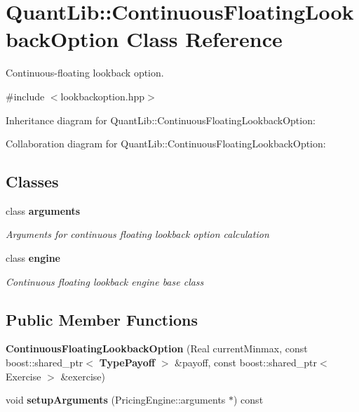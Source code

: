 \section{Quant\+Lib\+:\+:Continuous\+Floating\+Lookback\+Option Class Reference}
\label{class_quant_lib_1_1_continuous_floating_lookback_option}


Continuous-\/floating lookback option.  




{\ttfamily \#include $<$lookbackoption.\+hpp$>$}



Inheritance diagram for Quant\+Lib\+:\+:Continuous\+Floating\+Lookback\+Option\+:


Collaboration diagram for Quant\+Lib\+:\+:Continuous\+Floating\+Lookback\+Option\+:
\subsection*{Classes}
\begin{DoxyCompactItemize}
\item 
class {\bf arguments}
\begin{DoxyCompactList}\small\item\em Arguments for continuous floating lookback option calculation \end{DoxyCompactList}\item 
class {\bf engine}
\begin{DoxyCompactList}\small\item\em Continuous floating lookback engine base class \end{DoxyCompactList}\end{DoxyCompactItemize}
\subsection*{Public Member Functions}
\begin{DoxyCompactItemize}
\item 
{\bfseries Continuous\+Floating\+Lookback\+Option} (Real current\+Minmax, const boost\+::shared\+\_\+ptr$<$ {\bf Type\+Payoff} $>$ \&payoff, const boost\+::shared\+\_\+ptr$<$ Exercise $>$ \&exercise)\label{class_quant_lib_1_1_continuous_floating_lookback_option_a9d1ec2bfb5f4f1748b133d9aa3a1fa14}

\item 
void {\bfseries setup\+Arguments} (Pricing\+Engine\+::arguments $\ast$) const \label{class_quant_lib_1_1_continuous_floating_lookback_option_adfd64cc756ca029fc7c583e7bd8d702f}

\end{DoxyCompactItemize}
